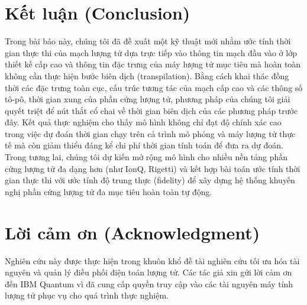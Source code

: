 \documentclass[11pt, a4paper]{article}
\begin{document}
\section{Kết luận (Conclusion)}
Trong bài báo này, chúng tôi đã đề xuất một kỹ thuật mới nhằm ước tính thời gian thực thi của mạch lượng tử dựa trực tiếp vào thông tin mạch đầu vào ở lớp thiết kế cấp cao và thông tin đặc trưng của máy lượng tử mục tiêu mà hoàn toàn không cần thực hiện bước biên dịch (transpilation). Bằng cách khai thác đồng thời các đặc trưng toàn cục, cấu trúc tương tác của mạch cấp cao và các thông số tô-pô, thời gian xung của phần cứng lượng tử, phương pháp của chúng tôi giải quyết triệt để nút thắt cổ chai về thời gian biên dịch của các phương pháp trước đây. Kết quả thực nghiệm cho thấy mô hình không chỉ đạt độ chính xác cao trong việc dự đoán thời gian chạy trên cả trình mô phỏng và máy lượng tử thực tế mà còn giảm thiểu đáng kể chi phí thời gian tính toán để đưa ra dự đoán. Trong tương lai, chúng tôi dự kiến mở rộng mô hình cho nhiều nền tảng phần cứng lượng tử đa dạng hơn (như IonQ, Rigetti) và kết hợp bài toán ước tính thời gian thực thi với ước tính độ trung thực (fidelity) để xây dựng hệ thống khuyến nghị phần cứng lượng tử đa mục tiêu hoàn toàn tự động.

\section*{Lời cảm ơn (Acknowledgment)}
Nghiên cứu này được thực hiện trong khuôn khổ đề tài nghiên cứu tối ưu hóa tài nguyên và quản lý điều phối điện toán lượng tử. Các tác giả xin gửi lời cảm ơn đến IBM Quantum vì đã cung cấp quyền truy cập vào các tài nguyên máy tính lượng tử phục vụ cho quá trình thực nghiệm.
\end{document}
